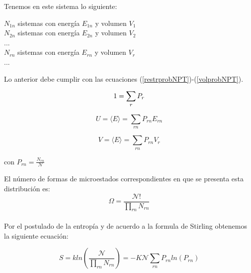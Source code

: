 \newpage

Tenemos en este sistema lo siguiente:\\

\begin{center}
    $N_{1n}$ sistemas con energía $E_{1n}$ y volumen $V_1$\\
    $N_{2n}$ sistemas con energía $E_{2n}$ y volumen $V_2$\\
    ...\\
    $N_{rn}$ sistemas con energía $E_{rn}$ y volumen $V_r$\\
    ...\\
\end{center}

Lo anterior debe cumplir con las ecuaciones (\ref{restrprobNPT})-(\ref{volprobNPT}).

\begin{equation} \label{restrprobNPT}
    1 = \sum_r P_r \\
\end{equation}

\begin{equation} \label{energiaprobNPT}
    U = \langle E\rangle = \sum_{rn} P_{rn} E_{rn}
\end{equation}

\begin{equation} \label{volprobNPT}
    V = \langle E\rangle = \sum_{rn} P_{rn} V_r
\end{equation}

\begin{center}
    con $P_{rn} = \frac{N_{rn}}{\mathcal{N}}$
\end{center}

El número de formas de microestados correspondientes en que se presenta esta distribución es:\\

\begin{equation} \label{distribucionmultnom}
    \Omega = \frac{\mathcal{N}!}{\prod_{rn} N_{rn}}
\end{equation}\\

Por el postulado de la entropía y de acuerdo a la formula de Stirling obtenemos la siguiente ecuación:

\begin{equation}  \label{entropiaboltzNPT}
    S = kln(\frac{\mathcal{N}}{\prod_{rn} N_{rn}}) = -K\mathcal{N}\sum_{rn} P_{rn} ln(P_{rn})
\end{equation}\\

